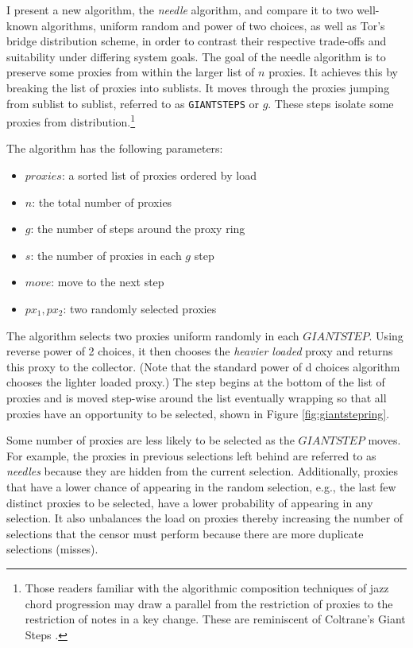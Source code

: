 I present a new algorithm, the \emph{needle} algorithm, and compare it to two well-known algorithms, uniform random and power of two choices, as well as Tor's bridge distribution scheme, in order to contrast their respective trade-offs and suitability under differing system goals. The goal of the needle algorithm is to preserve some proxies from within the larger list of $n$ proxies. It achieves this by breaking the list of proxies into sublists. It moves through the proxies jumping from sublist to sublist, referred to as \texttt{GIANTSTEPS} or $g$. These steps isolate some proxies from distribution.\footnote{Those readers familiar with the algorithmic composition techniques of jazz chord progression may draw a parallel from the restriction of proxies to the restriction of notes in a key change. These are reminiscent of Coltrane's Giant Steps \cite{lateef1981repository}.}

The algorithm has the following parameters:
    \begin{itemize}
        \item $proxies$: a sorted list of proxies ordered by load
        \item $n$: the total number of proxies
        \item $g$: the number of steps around the proxy ring
        \item $s$: the number of proxies in each $g$ step
        \item $move$: move to the next step 
        \item $px_1, px_2$: two randomly selected proxies
    \end{itemize}

The algorithm selects two proxies uniform randomly in each $GIANTSTEP$. Using reverse power of 2 choices, it then chooses the \textit{heavier loaded} proxy and returns this proxy to the collector. (Note that the standard power of d choices algorithm chooses the lighter loaded proxy.) The step begins at the bottom of the list of proxies and is moved step-wise around the list eventually wrapping so that all proxies have an opportunity to be selected, shown in Figure \ref{fig:giantstepring}.

Some number of proxies are less likely to be selected as the $GIANTSTEP$ moves. For example, the proxies in previous selections left behind are referred to as \emph{needles} because they are hidden from the current selection. Additionally, proxies that have a lower chance of appearing in the random selection, e.g., the last few distinct proxies to be selected, have a lower probability of appearing in any selection. It also unbalances the load on proxies thereby increasing the number of selections that the censor must perform because there are more duplicate selections (misses).

